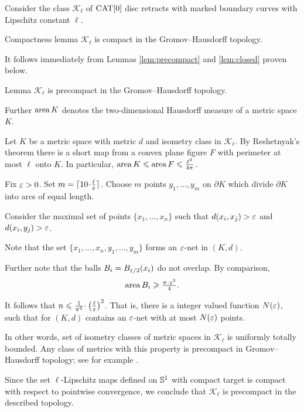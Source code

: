 \documentclass{article}
\begin{document}
Consider the class $\mathcal{K}_\ell$ of $\mathop{\rm CAT}\nolimits[0]$ disc retracts with marked
boundary curves with Lipschitz constant $\ell$.


\begin{thm}{Compactness lemma}\label{lem:compact}
$\mathcal{K}_\ell$ is compact in the Gromov--Hausdorff topology.
\end{thm}

It follows immediately from Lemmas \ref{lem:precompact} and \ref{lem:closed} proven below.

\begin{thm}{Lemma}\label{lem:precompact}
$\mathcal{K}_\ell$ is precompact in the Gromov--Hausdorff topology.
\end{thm}

Further $\mathop{\rm area}\nolimits K$ denotes the two-dimensional Hausdorff measure of a metric space $K$. 

Let $K$ be a metric space with metric $d$ and isometry class in $\mathcal {K}_\ell$.
By Reshetnyak's theorem there is a short map from a convex plane figure $F$ with perimeter at most $\ell$ onto $K$.
In particular, $\mathop{\rm area}\nolimits K \leqslant \mathop{\rm area}\nolimits F \leqslant \tfrac{\ell^2}{4\pi}$.

Fix $\varepsilon>0$. 
Set $m=\lceil 10\cdot\tfrac\ell\eps\rceil$.
Choose $m$ points $y_1,\dots,y_m$ on $\partial K$
which divide $\partial K$ into arcs of equal length.

Consider the maximal set of points $\{x_1,\dots,x_n\}$ such that $d(x_i,x_j)>\varepsilon$ and $d(x_i,y_j)>\varepsilon$.

Note that the set $\{x_1,\dots,x_n,y_1,\dots,y_m\}$
forms an $\varepsilon$-net in $(K,d)$.

Further note that the balls $B_i=B_{\varepsilon/2}(x_i)$
do not overlap.
By comparison,
\[\area B_i\ge \tfrac{\pi\cdot\eps^2}{4}.\]

It follows that $n\le \tfrac{1}{\pi^2}\cdot\left(\tfrac\ell\eps\right)^2$.
That is, there is a integer valued function $N(\varepsilon)$,
such that for  
$(K,d)$ contains an $\varepsilon$-net
with at most $N(\varepsilon)$ points.

In other words, set of isometry classes of metric spaces in $\mathcal{K}_\ell$ is uniformly totally bounded.
Any class of metrics with this property is precompact in Gromov--Hausdorff topology; 
see for example \cite[7.4.15]{BBI}.

Since the set $\ell$-Lipschitz maps defined on $\mathbb{S}^1$ with compact target is compact with respect to pointwise convergence, we conclude that $\mathcal{K}_\ell$ is precompact in the described topology. 
\qeds
\end{document}

